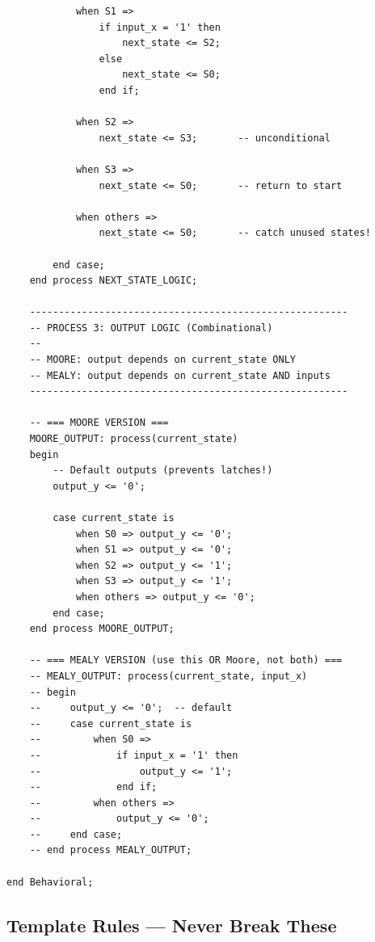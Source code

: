 \documentclass[12pt,a4paper]{article}
\begin{document}
{\begin{verbatim}
            when S1 =>
                if input_x = '1' then
                    next_state <= S2;
                else
                    next_state <= S0;
                end if;

            when S2 =>
                next_state <= S3;       -- unconditional

            when S3 =>
                next_state <= S0;       -- return to start

            when others =>
                next_state <= S0;       -- catch unused states!

        end case;
    end process NEXT_STATE_LOGIC;

    -------------------------------------------------------
    -- PROCESS 3: OUTPUT LOGIC (Combinational)
    --
    -- MOORE: output depends on current_state ONLY
    -- MEALY: output depends on current_state AND inputs
    -------------------------------------------------------

    -- === MOORE VERSION ===
    MOORE_OUTPUT: process(current_state)
    begin
        -- Default outputs (prevents latches!)
        output_y <= '0';

        case current_state is
            when S0 => output_y <= '0';
            when S1 => output_y <= '0';
            when S2 => output_y <= '1';
            when S3 => output_y <= '1';
            when others => output_y <= '0';
        end case;
    end process MOORE_OUTPUT;

    -- === MEALY VERSION (use this OR Moore, not both) ===
    -- MEALY_OUTPUT: process(current_state, input_x)
    -- begin
    --     output_y <= '0';  -- default
    --     case current_state is
    --         when S0 =>
    --             if input_x = '1' then
    --                 output_y <= '1';
    --             end if;
    --         when others =>
    --             output_y <= '0';
    --     end case;
    -- end process MEALY_OUTPUT;

end Behavioral;
\end{verbatim}
}

\subsection{Template Rules --- Never Break These}
\end{document}
